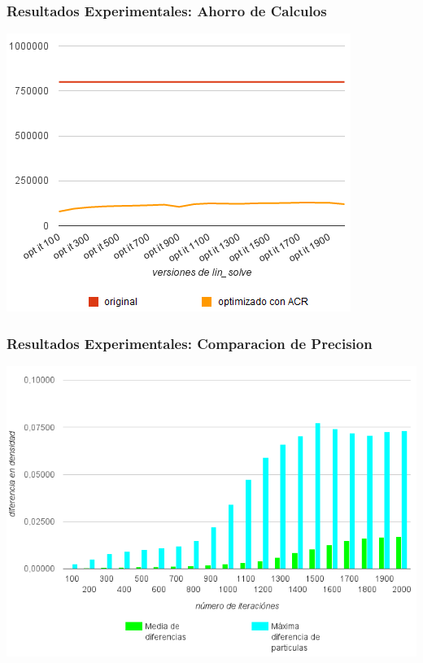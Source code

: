 \documentclass{beamer}\usetheme{Madrid} %
\begin{document}
\begin{frame}
\frametitle{Resultados Experimentales: Ahorro de Calculos}
\begin{center}
\includegraphics[scale=0.75]{img/calculos.png}
\end{center}
\end{frame}
\begin{frame}
\frametitle{Resultados Experimentales: Comparacion de Precision}
\begin{center}
\includegraphics[scale=0.60]{img/precision_recortado.png}
\end{center}
\end{frame}


\end{document}
